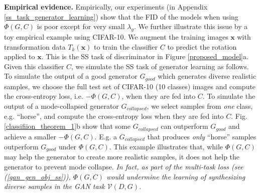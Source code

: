 \documentclass{article}
\begin{document}
{\bf Empirical evidence.}
Empirically, our experiments (in Appendix \ref{ss_task_generator_learning}) show that  the FID of the models when using 
$\Phi(G,C)$
is poor except for very small
$\lambda_g$.
We further illustrate this issue by a toy empirical example using CIFAR-10.
We augment the  training images $\mathbf{x}$ with transformation data $T_k(\mathbf{x})$ to train the classifier $C$ to predict 
the rotation applied to $\mathbf{x}$.
This is the SS task of discriminator in 
Figure \ref{proposed_model}a.
Given this classifier $C$, we simulate the SS task of generator learning as follows.
To simulate the output of a good generator $G_{good}$ which generates diverse realistic samples, we choose the full test set of CIFAR-10 (10 classes) images and compute the cross-entropy loss, i.e. $-\Phi(G,C)$, when they are fed into $C$. 
To simulate the output of a mode-collapsed generator $G_{collapsed}$, we select samples from {\em one} class, e.g. ``horse'', and compute the cross-entropy loss when they are fed into $C$.
Fig. \ref{classifiion_theorem_1}b show that some $G_{collapsed}$ can outperform $G_{good}$ and achieve a smaller $-\Phi(G,C)$. E.g. a $G_{collapsed}$ that produces {\em only} ``horse'' samples outperform $G_{good}$ under $\Phi(G,C)$.  This example illustrates that, while 
$\Phi(G,C)$ may help the generator to create more realistic samples, it does not help the generator to prevent mode collapse. {\em In fact, as part of the multi-task loss
(see (\ref{gan_gen_obj_ss})), $\Phi(G,C)$ would undermine the learning of synthesizing diverse samples in the GAN task $\mathcal{V}(D,G)$.}
\end{document}
